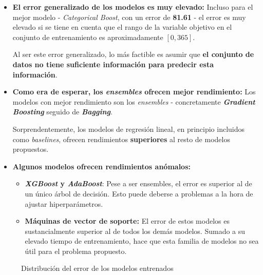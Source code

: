 \begin{itemize}[leftmargin=*, parsep=1pt, itemsep=2pt, topsep=1pt]
	\item \textbf{El error generalizado de los modelos es muy elevado:} Incluso para el mejor modelo - \textit{Categorical Boost}, con un error de \textbf{81.61} - el error es muy elevado si se tiene en cuenta que el rango de la variable objetivo en el conjunto de entrenamiento es aproximadamente $[0, 365]$.
	
	Al ser este error generalizado, lo más factible es asumir que \textbf{el conjunto de datos no tiene suficiente información para predecir esta información}.
	\item \textbf{Como era de esperar, los \textit{ensembles} ofrecen mejor rendimiento:} Los modelos con mejor rendimiento son los \textit{ensembles} - concretamente \textbf{\textit{Gradient Boosting}} seguido de \textbf{\textit{Bagging}}.
	
	Sorprendentemente, los modelos de regresión lineal, en principio incluidos como \textit{baselines}, ofrecen rendimientos \textbf{superiores} al resto de modelos propuestos.
	\item \textbf{Algunos modelos ofrecen rendimientos anómalos:}
	\begin{itemize}
		\item \textbf{\textit{XGBoost} y \textit{AdaBoost}}: Pese a ser ensembles, el error es superior al de un único árbol de decisión. Esto puede deberse a problemas a la hora de ajustar hiperparámetros.
		\item \textbf{Máquinas de vector de soporte:} El error de estos modelos es sustancialmente superior al de todos los demás modelos. Sumado a su elevado tiempo de entrenamiento, hace que esta familia de modelos no sea útil para el problema propuesto.
	\end{itemize}
\end{itemize}

\begin{figure}[h]
	\vspace{-6mm}
	\centering
	\captionsetup{belowskip=-5pt, justification=centering}
	\caption{Distribución del error de los modelos entrenados}
	\label{fig:ch5valerror}
\end{figure}

